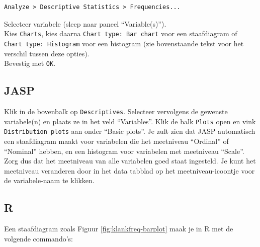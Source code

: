 \documentclass[
]{book}
\begin{document}
\begin{verbatim}
Analyze > Descriptive Statistics > Frequencies...
\end{verbatim}

Selecteer variabele (sleep naar paneel ``Variable(s)'').\\
Kies \texttt{Charts}, kies daarna \texttt{Chart\ type:\ Bar\ chart} voor een
staafdiagram of \texttt{Chart\ type:\ Histogram} voor een histogram (zie
bovenstaande tekst voor het verschil tussen deze opties).\\
Bevestig met \texttt{OK}.\\

\subsection{JASP}\label{jasp-2}

Klik in de bovenbalk op \texttt{Descriptives}. Selecteer vervolgens de gewenste variabele(n) en plaats ze in het veld ``Variables''. Klik de balk \texttt{Plots} open en vink \texttt{Distribution\ plots} aan onder ``Basic plots''. Je zult zien dat JASP automatisch een staafdiagram maakt voor variabelen die het meetniveau ``Ordinal'' of ``Nominal'' hebben, en een histogram voor variabelen met meetniveau ``Scale''. Zorg dus dat het meetniveau van alle variabelen goed staat ingesteld. Je kunt het meetniveau veranderen door in het data tabblad op het meetniveau-icoontje voor de variabele-naam te klikken.

\subsection{R}\label{r-2}

Een staafdiagram zoals Figuur \ref{fig:klankfreq-barplot} maak je in R met de volgende commando's:
\end{document}
